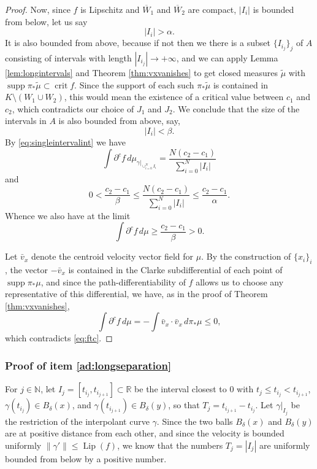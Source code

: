 \documentclass[11pt]{article}
\theoremstyle{definition}
\theoremstyle{remark}
\DeclareMathOperator{\supp}{supp}
\DeclareMathOperator{\lip}{Lip}
\newcommand{\R}{\mathbb{R}}
\newcommand{\N}{\mathbb{N}}
\renewcommand{\geq}{\geqslant}
\renewcommand{\leq}{\leqslant}
\newcommand{\meas}[2]{\mu_{#1|_{#2}}}
\begin{document}
\begin{proof}
 
 
 Now, since $f$ is Lipschitz and $\overline W_1$ and $\overline W_2$ are compact, $|I_i|$ is bounded from below, let us say
 \[|I_i|>\alpha.\] 
 It is also bounded from above, because if not then we there is a subset $\{I_{i_j}\}_j$ of $A$ consisting of intervals  with length $|I_{i_j}|\to +\infty$, and we can apply Lemma \ref{lem:longintervals} and Theorem \ref{thm:vxvanishes} to get closed measures $\tilde\mu$ with 
 $\supp\pi_*\tilde\mu\subset\operatorname{crit}f$. Since the support of each such $\pi_*\tilde\mu$ is contained in $K\setminus (W_1\cup W_2)$, this would mean the existence of a critical value between $c_1$ and $c_2$, which contradicts our choice of $J_1$ and $J_2$. We conclude that the size of the intervals in $A$ is also bounded from above, say,
 \[|I_i|<\beta.\]
 By \eqref{eq:singleintervalint} we have
 \[\int \partial^cf\,d\meas{\gamma}{\cup_{i=0}^NI_i}=\frac{N(c_2-c_1)}{\sum_{i=0}^N|I_i|}\]
 and
 \[0<\frac{c_2-c_1}{\beta }\leq \frac{N(c_2-c_1)}{\sum_{i=0}^N|I_i|}\leq \frac{c_2-c_1}{\alpha}.\]
 Whence we also have at the limit
 \begin{equation}\label{eq:ftc}\int \partial^cf\,d\mu\geq \frac{c_2-c_1}{\beta}>0.\end{equation}
 
 Let $\bar v_x$ denote the centroid velocity vector field for $\mu$. By the construction of $\{x_i\}_i$, the vector $-\bar v_x$ is contained in the Clarke subdifferential of each point of $\supp\pi_*\mu$, and since the path-differentiability of $f$ allows us to choose any representative of this differential, we have, as in the proof of Theorem \ref{thm:vxvanishes},
 \[\int\partial^cf\,d\mu=-\int\bar v_x\cdot \bar v_x\,d\pi_*\mu\leq 0,\]
 which contradicts \eqref{eq:ftc}.
\end{proof}

\subsubsection{Proof of item \ref{ad:longseparation}}
\label{sec:pfaddendum5}

For $j\in\N$, let  $I_j=[t_{i_j},t_{i_{j+1}}]\subset\R$ be the interval closest to 0 with $t_j\leq t_{i_j}<t_{i_{j+1}}$, $\gamma(t_{i_j})\in B_\delta(x)$, and $\gamma(t_{i_{j+1}})\in B_\delta(y)$, so that $T_j=t_{i_{j+1}}-t_{i_j}$. Let $\gamma|_{I_j}$ be the restriction of the interpolant curve $\gamma$. Since the two balls $B_\delta(x)$ and $B_\delta(y)$ are at positive distance from each other, and since the velocity is bounded uniformly $\|\gamma'\|\leq \lip(f)$, we know that the numbers $T_j=|I_j|$ are uniformly bounded from below by a positive number.
\end{document}
